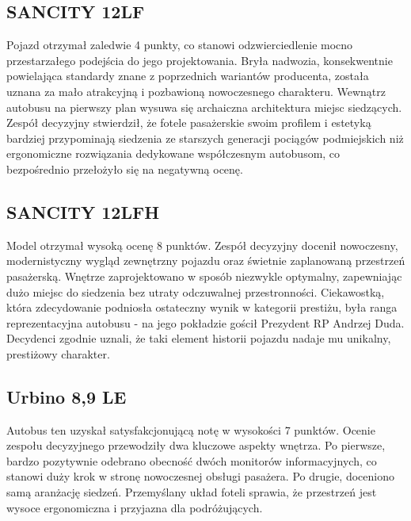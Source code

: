 \subsection{SANCITY 12LF}
Pojazd otrzymał zaledwie 4 punkty, co stanowi odzwierciedlenie mocno przestarzałego podejścia do jego projektowania. Bryła nadwozia, konsekwentnie powielająca standardy znane z poprzednich wariantów producenta, została uznana za mało atrakcyjną i pozbawioną nowoczesnego charakteru. Wewnątrz autobusu na pierwszy plan wysuwa się archaiczna architektura miejsc siedzących. Zespół decyzyjny stwierdził, że fotele pasażerskie swoim profilem i estetyką bardziej przypominają siedzenia ze starszych generacji pociągów podmiejskich niż ergonomiczne rozwiązania dedykowane współczesnym autobusom, co bezpośrednio przełożyło się na negatywną ocenę.

\subsection{SANCITY 12LFH}
Model otrzymał wysoką ocenę 8 punktów. Zespół decyzyjny docenił nowoczesny, modernistyczny wygląd zewnętrzny pojazdu oraz świetnie zaplanowaną przestrzeń pasażerską. Wnętrze zaprojektowano w sposób niezwykle optymalny, zapewniając dużo miejsc do siedzenia bez utraty odczuwalnej przestronności. Ciekawostką, która zdecydowanie podniosła ostateczny wynik w kategorii prestiżu, była ranga reprezentacyjna autobusu - na jego pokładzie gościł Prezydent RP Andrzej Duda. Decydenci zgodnie uznali, że taki element historii pojazdu nadaje mu unikalny, prestiżowy charakter.

\subsection{Urbino 8,9 LE}
Autobus ten uzyskał satysfakcjonującą notę w wysokości 7 punktów. Ocenie zespołu decyzyjnego przewodziły dwa kluczowe aspekty wnętrza. Po pierwsze, bardzo pozytywnie odebrano obecność dwóch monitorów informacyjnych, co stanowi duży krok w stronę nowoczesnej obsługi pasażera. Po drugie, doceniono samą aranżację siedzeń. Przemyślany układ foteli sprawia, że przestrzeń jest wysoce ergonomiczna i przyjazna dla podróżujących.

